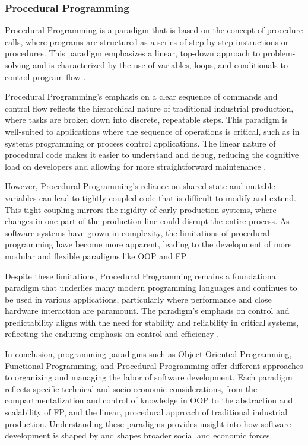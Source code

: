 \begin{refsection}
\subsubsection{Procedural Programming}

Procedural Programming is a paradigm that is based on the concept of procedure calls, where programs are structured as a series of step-by-step instructions or procedures. This paradigm emphasizes a linear, top-down approach to problem-solving and is characterized by the use of variables, loops, and conditionals to control program flow \cite[pp.~45-48]{Pfleeger2010}.

Procedural Programming's emphasis on a clear sequence of commands and control flow reflects the hierarchical nature of traditional industrial production, where tasks are broken down into discrete, repeatable steps. This paradigm is well-suited to applications where the sequence of operations is critical, such as in systems programming or process control applications. The linear nature of procedural code makes it easier to understand and debug, reducing the cognitive load on developers and allowing for more straightforward maintenance \cite[pp.~78-81]{Pressman2019}.

However, Procedural Programming’s reliance on shared state and mutable variables can lead to tightly coupled code that is difficult to modify and extend. This tight coupling mirrors the rigidity of early production systems, where changes in one part of the production line could disrupt the entire process. As software systems have grown in complexity, the limitations of procedural programming have become more apparent, leading to the development of more modular and flexible paradigms like OOP and FP \cite[pp.~112-115]{Bass2021}.

Despite these limitations, Procedural Programming remains a foundational paradigm that underlies many modern programming languages and continues to be used in various applications, particularly where performance and close hardware interaction are paramount. The paradigm's emphasis on control and predictability aligns with the need for stability and reliability in critical systems, reflecting the enduring emphasis on control and efficiency \cite[pp.~85-88]{Pressman2019}.

In conclusion, programming paradigms such as Object-Oriented Programming, Functional Programming, and Procedural Programming offer different approaches to organizing and managing the labor of software development. Each paradigm reflects specific technical and socio-economic considerations, from the compartmentalization and control of knowledge in OOP to the abstraction and scalability of FP, and the linear, procedural approach of traditional industrial production. Understanding these paradigms provides insight into how software development is shaped by and shapes broader social and economic forces.


\end{refsection}
